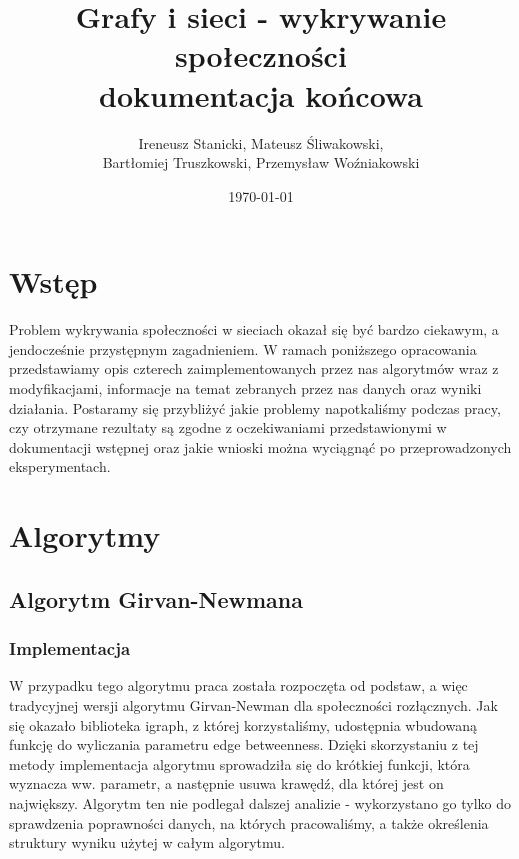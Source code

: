 \documentclass{article}
\title{Grafy i sieci - wykrywanie społeczności\\dokumentacja końcowa}
\date{\today}
\author{Ireneusz Stanicki, Mateusz Śliwakowski,\\Bartłomiej Truszkowski, Przemysław Woźniakowski}
\begin{document}
	\begin{titlingpage}
		\maketitle
	\end{titlingpage}

\tableofcontents
\newpage

\section{Wstęp}
Problem wykrywania społeczności w sieciach okazał się być bardzo ciekawym, a jendocześnie przystępnym zagadnieniem. W ramach poniższego opracowania przedstawiamy opis czterech zaimplementowanych przez nas algorytmów wraz z modyfikacjami, informacje na temat zebranych przez nas danych oraz wyniki działania. Postaramy się przybliżyć jakie problemy napotkaliśmy podczas pracy, czy otrzymane rezultaty są zgodne z oczekiwaniami przedstawionymi w dokumentacji wstępnej oraz jakie wnioski można wyciągnąć po przeprowadzonych eksperymentach.

\section{Algorytmy}

\subsection{Algorytm Girvan-Newmana}
\subsubsection{Implementacja}

W przypadku tego algorytmu praca została rozpoczęta od podstaw, a więc tradycyjnej wersji algorytmu Girvan-Newman dla społeczności rozłącznych. Jak się okazało biblioteka igraph, z której korzystaliśmy, udostępnia wbudowaną funkcję do wyliczania parametru edge betweenness. Dzięki skorzystaniu z tej metody implementacja algorytmu sprowadziła się do krótkiej funkcji, która wyznacza ww. parametr, a następnie usuwa krawędź, dla której jest on największy. Algorytm ten nie podlegał dalszej analizie - wykorzystano go tylko do sprawdzenia poprawności danych, na których pracowaliśmy, a także określenia struktury wyniku użytej w całym algorytmu.\\
\end{document}
